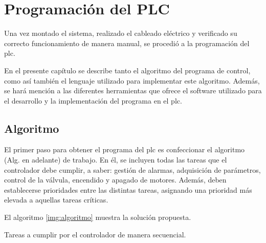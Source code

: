 \chapter{Programación del PLC}
\label{ch:progPLC}

Una vez montado el sistema, realizado el cableado eléctrico y verificado su
correcto funcionamiento de
manera manual, se procedió a la programación del \gls{plc}.

En el presente capítulo se describe tanto el algoritmo del programa de control,
como así también el lenguaje utilizado para implementar este algoritmo.
Además, se hará mención a las diferentes herramientas que ofrece el software
utilizado para el desarrollo y la implementación del programa en el \gls{plc}.

\section{Algoritmo}
\label{sec:Algoritmo}
El primer paso para obtener el programa del \gls{plc} es
confeccionar el algoritmo (Alg. en adelante) de trabajo.
En él, se incluyen todas las tareas que el
controlador debe cumplir, a saber: gestión de alarmas, adquisición de
parámetros, control de la válvula, encendido y apagado de motores.
Además, deben establecerse prioridades entre las distintas tareas,
asignando una prioridad más elevada a aquellas tareas críticas.

El algoritmo \ref{img:algoritmo} muestra la solución propuesta.

\begin{algorithm}[!ht]
 \small
 \caption{Tareas a cumplir por el controlador de manera secuencial.}
 \label{img:algoritmo}
\end{algorithm}

